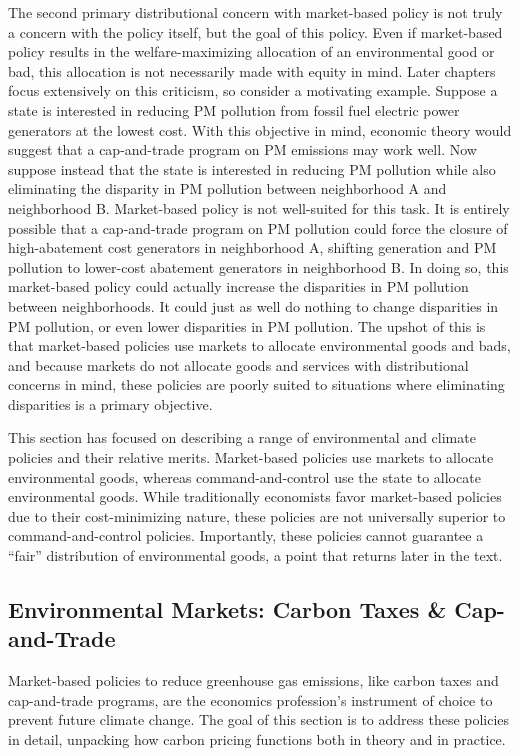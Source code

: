 The second primary distributional concern with market-based policy is not truly a concern with the policy itself, but the goal of this policy. Even if market-based policy results in the welfare-maximizing allocation of an environmental good or bad, this allocation is not necessarily made with equity in mind. Later chapters focus extensively on this criticism, so consider a motivating example. Suppose a state is interested in reducing PM  pollution from fossil fuel electric power generators at the lowest cost. With this objective in mind, economic theory would suggest that a cap-and-trade program on PM emissions may work well. Now suppose instead that the state is interested in reducing PM pollution while also eliminating the disparity in PM pollution between neighborhood A and neighborhood B. Market-based policy is not well-suited for this task. It is entirely possible that a cap-and-trade program on PM pollution could force the closure of high-abatement cost generators in neighborhood A, shifting generation and PM pollution to lower-cost abatement generators in neighborhood B. In doing so, this market-based policy could actually increase the disparities in PM pollution between neighborhoods. It could just as well do nothing to change disparities in PM pollution, or even lower disparities in PM pollution. The upshot of this is that market-based policies use markets to allocate environmental goods and bads, and because markets do not allocate goods and services with distributional concerns in mind, these policies are poorly suited to situations where eliminating disparities is a primary objective. 

This section has focused on describing a range of environmental and climate policies and their relative merits. Market-based policies use markets to allocate environmental goods, whereas command-and-control use the state to allocate environmental goods. While traditionally economists favor market-based policies due to their cost-minimizing nature, these policies are not universally superior to command-and-control policies. Importantly, these policies cannot guarantee a ``fair'' distribution of environmental goods, a point that returns later in the text.



\subsection{Environmental Markets: Carbon Taxes \& Cap-and-Trade}

Market-based policies to reduce greenhouse gas emissions, like carbon taxes and cap-and-trade programs, are the economics profession's instrument of choice to prevent future climate change. The goal of this section is to address these policies in detail, unpacking how carbon pricing functions both in theory and in practice. 

